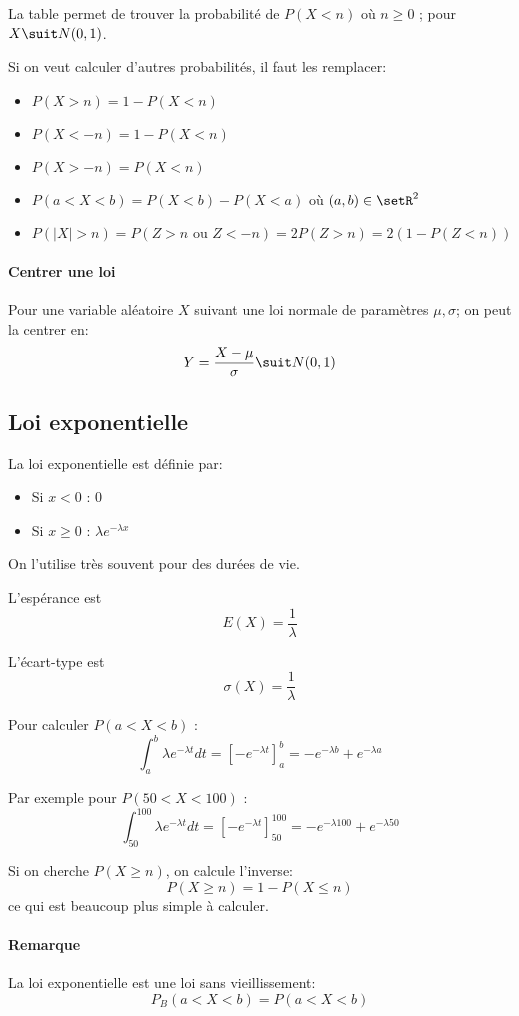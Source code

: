 \documentclass[10pt,a4paper,french]{article}
\begin{document}
La table permet de trouver la probabilité de $P(X < n)$ où $n \geq 0$ ; pour $X \suit N(0, 1)$.

Si on veut calculer d'autres probabilités, il faut les remplacer:
\begin{itemize}
\item $P(X > n) = 1 - P(X < n)$
\item $P(X < -n) = 1 - P(X < n)$
\item $P(X > -n) = P(X < n)$
\item $P(a < X < b) = P(X < b) - P(X < a)$ où $(a,b) \in \setR^2$
\item $P(\vert X \vert > n) = P(Z > n \text{ ou } Z < -n) = 2 P(Z > n) = 2 (1-P(Z < n))$
\end{itemize}

\paragraph{Centrer une loi}
Pour une variable aléatoire $X$ suivant une loi normale de paramètres $\mu, \sigma$; on peut la centrer en: 
\[Y = \frac{X - \mu}{\sigma} \suit N(0, 1)\]

\subsection{Loi exponentielle}

La loi exponentielle est définie par:
\begin{itemize}
\item Si $x < 0$ : 0
\item Si $x \geq 0$ : $\lambda e^{-\lambda x}$
\end{itemize}

On l'utilise très souvent pour des durées de vie.

L'espérance est \[E(X) = \frac{1}{\lambda}\]

L'écart-type est \[ \sigma(X) = \frac{1}{\lambda} \]

Pour calculer $P(a < X < b)$ : \[ \int_a^b \lambda e^{-\lambda t} dt = \left[ -e^{-\lambda t} \right]_a^b = -e^{-\lambda b} + e^{-\lambda a} \]

Par exemple pour $P(50 < X < 100)$ : \[ \int_{50}^{100} \lambda e^{-\lambda t} dt = \left[ -e^{-\lambda t} \right]_{50}^{100} = -e^{-\lambda 100} + e^{-\lambda 50} \]

Si on cherche $P(X \geq n)$, on calcule l'inverse: \[ P(X \geq n) = 1 - P(X \leq n) \] ce qui est beaucoup plus simple à calculer.

\paragraph{Remarque}
La loi exponentielle est une loi sans vieillissement: \[ P_B(a < X < b) = P(a < X < b) \]
\end{document}
